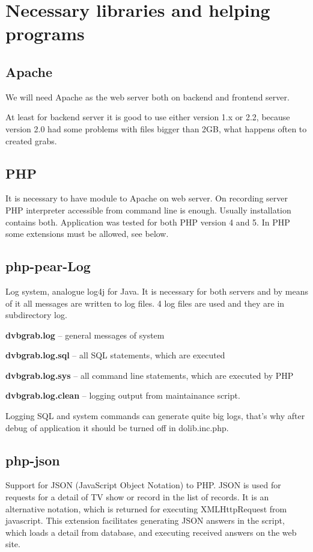 \section{Necessary libraries and helping programs}
\subsection{Apache}
We will need Apache as the web server both on backend and frontend server.

At least for backend server it is good to use either version 1.x or 2.2, because version 2.0 had some problems with files bigger than 2GB, what happens often to created grabs.
\subsection{PHP}
It is necessary to have module to Apache on web server. On recording server PHP interpreter accessible from command line is enough. Usually installation contains both. Application was tested for both PHP version 4 and 5. In PHP some extensions must be allowed, see below.
\subsection{php-pear-Log}
Log system, analogue log4j for Java. It is necessary for both servers and by means of it all messages are written to log files. 4 log files are used and they are in subdirectory log.
\bitem
\item\textbf{dvbgrab.log} -- general messages of system
\item\textbf{dvbgrab.log.sql} -- all SQL statements, which are executed
\item\textbf{dvbgrab.log.sys} -- all command line statements, which are executed by PHP
\item\textbf{dvbgrab.log.clean} -- logging output from maintainance script.
\eitem

Logging SQL and system commands can generate quite big logs, that's why after debug of application it should be turned off in dolib.inc.php.
\subsection{php-json}
Support for JSON (JavaScript Object Notation) to PHP. JSON is used for requests for a detail of TV show or record in the list of records. It is an alternative notation, which is returned for executing XMLHttpRequest from javascript. This extension facilitates generating JSON answers in the script, which loads a detail from database, and executing received answers on the web site.
